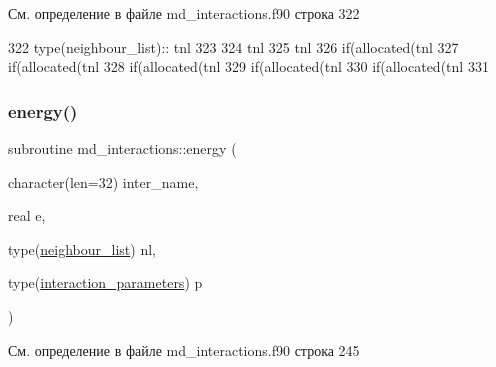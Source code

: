 См. определение в файле md\+\_\+interactions.\+f90 строка 322


\begin{DoxyCode}
322     \textcolor{keywordtype}{type}(neighbour\_list):: tnl
323     
324     tnl%
325     tnl%
326     \textcolor{keywordflow}{if}(\textcolor{keyword}{allocated}(tnl%
327     \textcolor{keywordflow}{if}(\textcolor{keyword}{allocated}(tnl%
328     \textcolor{keywordflow}{if}(\textcolor{keyword}{allocated}(tnl%
329     \textcolor{keywordflow}{if}(\textcolor{keyword}{allocated}(tnl%
330     \textcolor{keywordflow}{if}(\textcolor{keyword}{allocated}(tnl%
331     
\end{DoxyCode}
\mbox{\label{namespacemd__interactions_a5b3213ff25495c56eeabce8427fb3082}} 
\subsubsection{\texorpdfstring{energy()}{energy()}}
{\footnotesize\ttfamily subroutine md\+\_\+interactions\+::energy (\begin{DoxyParamCaption}\item[{character(len=32)}]{inter\+\_\+name,  }\item[{real}]{e,  }\item[{type(\mbox{\hyperlink{structmd__general_1_1neighbour__list}{neighbour\+\_\+list}})}]{nl,  }\item[{type(\mbox{\hyperlink{structmd__interactions_1_1interaction__parameters}{interaction\+\_\+parameters}})}]{p }\end{DoxyParamCaption})}



См. определение в файле md\+\_\+interactions.\+f90 строка 245


